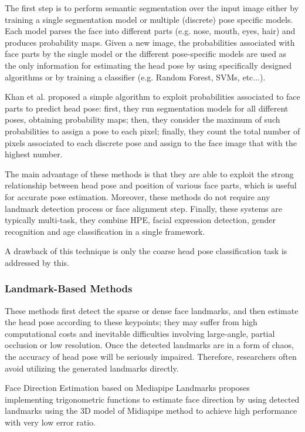 The first step is to perform semantic segmentation over the input image either by training a single segmentation model or multiple (discrete) pose specific models. Each model parses the face into different parts (e.g. nose, mouth, eyes, hair) and produces probability maps. Given a new image, the probabilities associated with face parts by the single model or the different pose-specific models are used as the only information for estimating the head pose by using specifically designed algorithms or by training a classifier (e.g. Random Forest, SVMs, etc...).

Khan et al. \cite{khan2020headpose} proposed a simple algorithm to exploit probabilities associated to face parts to predict head pose: first, they run segmentation models for all different poses, obtaining probability maps; then, they consider the maximum of such probabilities to assign a pose to each pixel; finally, they count the total number of pixels associated to each discrete pose and assign to the face image that with the highest number.

The main advantage of these methods is that they are able to exploit the strong relationship between head pose and position of various face parts, which is useful for accurate pose estimation. Moreover, these methods do not require any landmark detection process or face alignment step. Finally, these systems are typically multi-task, they combine HPE, facial expression detection, gender recognition and age classification in a single framework.

A drawback of this technique is only the coarse head pose classification task is addressed by this.

\subsubsection{Landmark-Based Methods}
These methods first detect the sparse or dense face landmarks, and then estimate the head pose according to these keypoints; they may suffer from high computational costs and inevitable difficulties involving large-angle, partial occlusion or low resolution. Once the detected landmarks are in a form of chaos, the accuracy of head pose will be seriously impaired. Therefore, researchers often avoid utilizing the generated landmarks directly.

Face Direction Estimation based on Mediapipe Landmarks \cite{alnuimi2021facedirection} proposes implementing trigonometric functions to estimate face direction by using detected landmarks using the 3D model of Midiapipe method to achieve high performance with very low error ratio.

